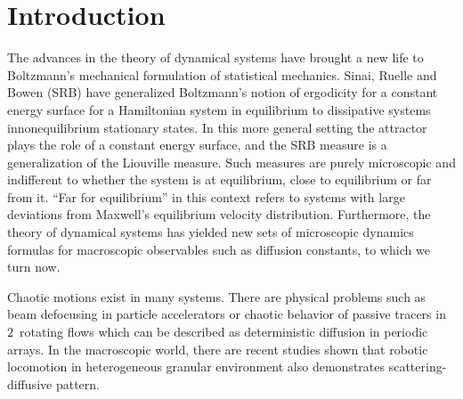 

\section{Introduction}



The advances in the theory of dynamical systems have brought a new life to Boltzmann's mechanical formulation of statistical mechanics. Sinai, Ruelle and Bowen (SRB) have generalized Boltzmann's notion of ergodicity for a constant energy surface for a Hamiltonian system in equilibrium to dissipative systems in{nonequilibrium} stationary states. In this more general setting the attractor plays the role of a constant energy surface, and the SRB measure is a generalization of the Liouville measure. Such measures are purely microscopic and indifferent to whether the system is at equilibrium, close to equilibrium or far from it. ``Far for equilibrium'' in this context refers to systems with large deviations from Maxwell's equilibrium velocity distribution. Furthermore, the theory of dynamical systems has yielded new sets of microscopic dynamics formulas for macroscopic observables such as diffusion constants, to which we turn now.

Chaotic motions exist in many systems. There are physical problems such as beam defocusing in particle accelerators  or chaotic behavior of passive tracers in $2$\dmn\ rotating flows which can be described as deterministic diffusion in periodic arrays. In the macroscopic world, there are recent studies shown that robotic locomotion in heterogeneous granular environment also demonstrates scattering-diffusive pattern.

%
%

